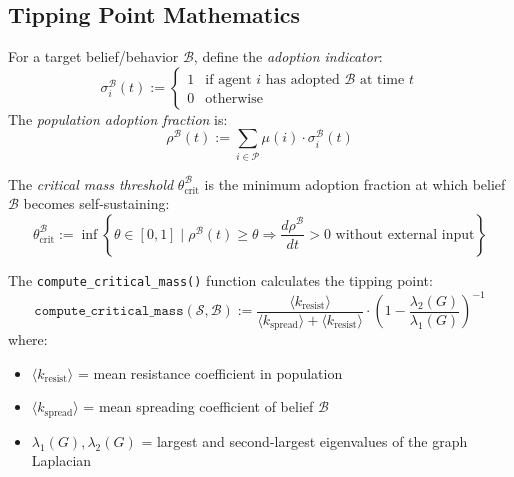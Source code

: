 \subsection{Tipping Point Mathematics}

\begin{definition}
\label{def:belief-adoption}
For a target belief/behavior $\mathcal{B}$, define the \emph{adoption indicator}:
\[
    \sigma_i^{\mathcal{B}}(t) := \begin{cases}
        1 & \text{if agent } i \text{ has adopted } \mathcal{B} \text{ at time } t \\
        0 & \text{otherwise}
    \end{cases}
\]
The \emph{population adoption fraction} is:
\[
    \rho^{\mathcal{B}}(t) := \sum_{i \in \mathcal{P}} \mu(i) \cdot \sigma_i^{\mathcal{B}}(t)
\]
\end{definition}

\begin{definition}
\label{def:critical-mass}
The \emph{critical mass threshold} $\theta_{\mathrm{crit}}^{\mathcal{B}}$ is the minimum adoption fraction at which belief $\mathcal{B}$ becomes self-sustaining:
\[
\boxed{
    \theta_{\mathrm{crit}}^{\mathcal{B}} := \inf \left\{ \theta \in [0,1] \;\Big|\;
    \rho^{\mathcal{B}}(t) \geq \theta \Rightarrow
    \frac{d\rho^{\mathcal{B}}}{dt} > 0 \text{ without external input} \right\}
}
\]
\end{definition}

\begin{definition}
\label{def:compute-critical-mass}
The \texttt{compute\_critical\_mass()} function calculates the tipping point:
\[
\boxed{
    \mathtt{compute\_critical\_mass}(\mathcal{S}, \mathcal{B}) :=
    \frac{\langle k_{\mathrm{resist}} \rangle}{\langle k_{\mathrm{spread}} \rangle + \langle k_{\mathrm{resist}} \rangle}
    \cdot \left(1 - \frac{\lambda_2(G)}{\lambda_1(G)}\right)^{-1}
}
\]
where:
\begin{itemize}
    \item $\langle k_{\mathrm{resist}} \rangle$ = mean resistance coefficient in population
    \item $\langle k_{\mathrm{spread}} \rangle$ = mean spreading coefficient of belief $\mathcal{B}$
    \item $\lambda_1(G), \lambda_2(G)$ = largest and second-largest eigenvalues of the graph Laplacian
\end{itemize}
\end{definition}

